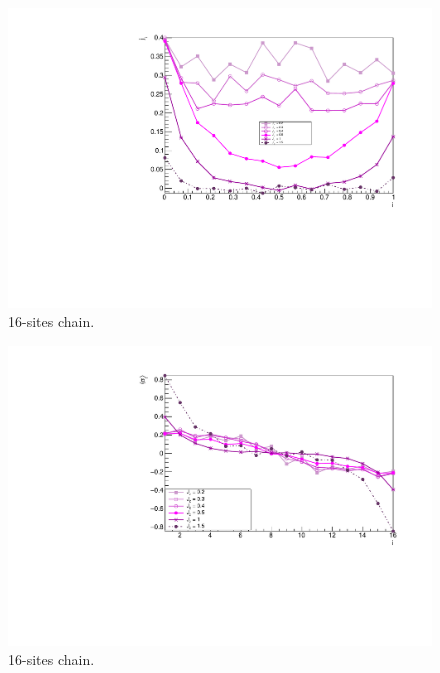 \begin{figure}[H]
    \centering
    \includegraphics[scale=0.7]{Figures/16sites/16sites_SpinCurrVsLOWJz.pdf}
    \caption{16-sites chain.}
    \label{fig:my_label}
\end{figure}

\begin{figure}[H]
    \centering
    \includegraphics[scale=0.7]{Figures/16sites/16sites_LMvsLOWJz.pdf}
    \caption{16-sites chain.}
    \label{fig:my_label}
\end{figure}